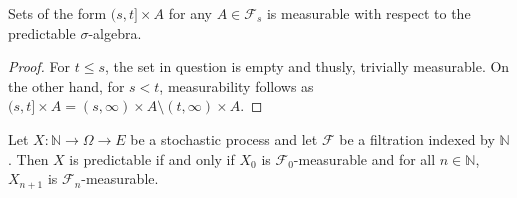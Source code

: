 \begin{lemma}\label{lem:predictable_Ioc_prod}
  \leanok
Sets of the form $(s, t] \times A$ for any $A \in \mathcal{F}_s$ is measurable with respect to the predictable $\sigma$-algebra.
\end{lemma}
\begin{proof}\leanok
For $t \le s$, the set in question is empty and thusly, trivially measurable. On the other hand, for $s < t$, measurability follows as
$(s, t] \times A = (s, \infty) \times A \setminus (t, \infty) \times A$.
\end{proof}

\begin{lemma}\label{lem:predictable_nat_iff}
  \leanok
Let $X : \mathbb{N} \to \Omega \to E$ be a stochastic process and let $\mathcal{F}$ be a filtration indexed by $\mathbb{N}$.
Then $X$ is predictable if and only if $X_0$ is $\mathcal{F}_0$-measurable and for all $n \in \mathbb{N}$, $X_{n+1}$ is $\mathcal{F}_n$-measurable.
\end{lemma}

